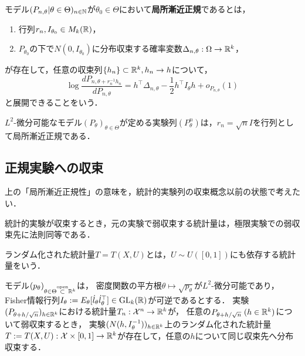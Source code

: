 \documentclass[uplatex,dvipdfmx]{jsreport}
\begin{document}
\begin{definition}
    モデル$(P_{n,\theta}|\theta\in\Theta)_{n\in\mathbb{N}}$が$\theta_0\in\Theta$において\textbf{局所漸近正規}であるとは，
    \begin{enumerate}
        \item 行列$r_n,I_{\theta_0}\in M_k(\mathbb{R})$，
        \item $P_{\theta_0}$の下で$N(0,I_{\theta_0})$に分布収束する確率変数$\Delta_{n,\theta}:\Omega\to\mathbb{R}^k$，
    \end{enumerate}
    が存在して，任意の収束列$\{h_n\}\subset\mathbb{R}^k,h_n\to h$について，
    \[\log\frac{dP_{n,\theta+r_n^{-1}h_n}}{dP_{n,\theta}}=h^\top\Delta_{n,\theta}-\frac{1}{2}h^\top I_\theta h+o_{P_{n,\theta}}(1)\]
    と展開できることをいう．
\end{definition}
\begin{example}
    $L^2$-微分可能なモデル$(P_\theta)_{\theta\in\Theta}$が定める実験列$(P^n_\theta)$は，$r_n=\sqrt{n}I$を行列として局所漸近正規である．
\end{example}

\subsection{正規実験への収束}

\begin{tcolorbox}[colframe=ForestGreen, colback=ForestGreen!10!white,breakable,colbacktitle=ForestGreen!40!white,coltitle=black,fonttitle=\bfseries\sffamily,
title=]
    上の「局所漸近正規性」の意味を，統計的実験列の収束概念以前の状態で考えたい．

\end{tcolorbox}

\begin{discussion}
    統計的実験が収束するとき，元の実験で弱収束する統計量は，極限実験での弱収束先に法則同等である．
\end{discussion}

\begin{definition}
    ランダム化された統計量$T=T(X,U)$とは，$U\sim U([0,1])$にも依存する統計量をいう．
\end{definition}

\begin{theorem}[局所漸近正規性の十分条件]
    モデル$(p_\theta)_{\theta\in\Theta\overset{\mathrm{open}}{\subset}\mathbb{R}^k}$は，
    密度関数の平方根$\theta\mapsto\sqrt{p_\theta}$が$L^2$-微分可能であり，Fisher情報行列$I_\theta:=E_\theta[\dot{l}_\theta\dot{l}_\theta^\top]\in\mathrm{GL}_k(\mathbb{R})$が可逆であるとする．
    実験$(P_{\theta+h/\sqrt{n}})_{h\in\mathbb{R}^k}$における統計量$T_n:\mathcal{X}^n\to\mathbb{R}^k$が，
    任意の$P_{\theta+h/\sqrt{n}}\;(h\in\mathbb{R}^k)$について弱収束するとき，
    実験$(N(h,I^{-1}_{\theta}))_{h\in\mathbb{R}^k}$上のランダム化された統計量$T:=T(X,U):\mathcal{X}\times[0,1]\to\mathbb{R}^k$が存在して，任意の$h$について同じ収束先へ分布収束する．
\end{theorem}
\end{document}
